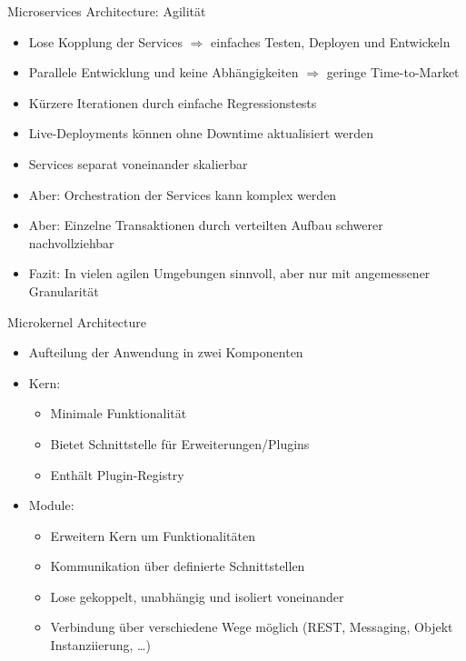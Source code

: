 

\begin{frame}{Microservices Architecture: Agilität}
    \begin{itemize}
        \item Lose Kopplung der Services $\Rightarrow$ einfaches Testen, Deployen und Entwickeln
        \item Parallele Entwicklung und keine Abhängigkeiten $\Rightarrow$ geringe Time-to-Market
        \item Kürzere Iterationen durch einfache Regressionstests
        \item Live-Deployments können ohne Downtime aktualisiert werden
        \item Services separat voneinander skalierbar
        \item Aber: Orchestration der Services kann komplex werden
        \item Aber: Einzelne Transaktionen durch verteilten Aufbau schwerer nachvollziehbar~\cite{architecturePatterns}
        \item Fazit: In vielen agilen Umgebungen sinnvoll, aber nur mit angemessener Granularität
    \end{itemize}
\end{frame}



\begin{frame}{Microkernel Architecture}
    \begin{itemize}
        \item Aufteilung der Anwendung in zwei Komponenten~\cite{architecturePatterns}
        \item Kern:
        \begin{itemize}
            \item Minimale Funktionalität
            \item Bietet Schnittstelle für Erweiterungen/Plugins
            \item Enthält Plugin-Registry
        \end{itemize}
        \item Module:
        \begin{itemize}
            \item Erweitern Kern um Funktionalitäten
            \item Kommunikation über definierte Schnittstellen
            \item Lose gekoppelt, unabhängig und isoliert voneinander
            \item Verbindung über verschiedene Wege möglich (REST, Messaging, Objekt Instanziierung, \ldots)
            \end{itemize}
    \end{itemize}
\end{frame}

